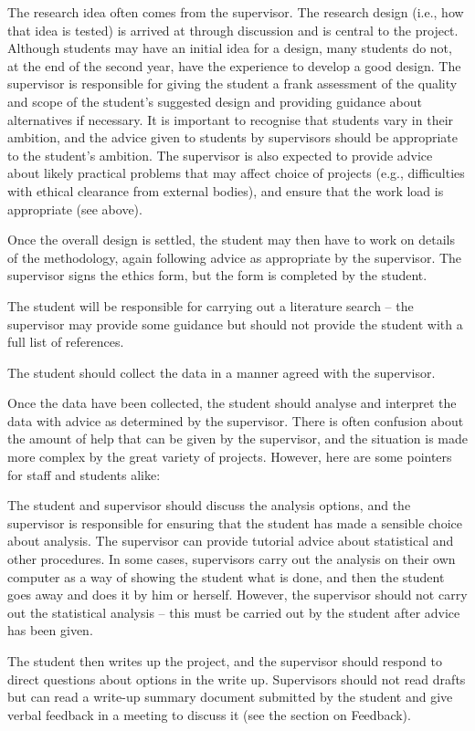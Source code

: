 \documentclass[
]{book}
\begin{document}
The research idea often comes from the supervisor. The research design (i.e., how that idea is tested) is arrived at through discussion and is central to the project. Although students may have an initial idea for a design, many students do not, at the end of the second year, have the experience to develop a good design. The supervisor is responsible for giving the student a frank assessment of the quality and scope of the student's suggested design and providing guidance about alternatives if necessary. It is important to recognise that students vary in their ambition, and the advice given to students by supervisors should be appropriate to the student's ambition. The supervisor is also expected to provide advice about likely practical problems that may affect choice of projects (e.g., difficulties with ethical clearance from external bodies), and ensure that the work load is appropriate (see above).

Once the overall design is settled, the student may then have to work on details of the methodology, again following advice as appropriate by the supervisor. The supervisor signs the ethics form, but the form is completed by the student.

The student will be responsible for carrying out a literature search -- the supervisor may provide some guidance but should not provide the student with a full list of references.

The student should collect the data in a manner agreed with the supervisor.

Once the data have been collected, the student should analyse and interpret the data with advice as determined by the supervisor. There is often confusion about the amount of help that can be given by the supervisor, and the situation is made more complex by the great variety of projects. However, here are some pointers for staff and students alike:

The student and supervisor should discuss the analysis options, and the supervisor is responsible for ensuring that the student has made a sensible choice about analysis. The supervisor can provide tutorial advice about statistical and other procedures. In some cases, supervisors carry out the analysis on their own computer as a way of showing the student what is done, and then the student goes away and does it by him or herself. However, the supervisor should not carry out the statistical analysis -- this must be carried out by the student after advice has been given.

The student then writes up the project, and the supervisor should respond to direct questions about options in the write up. Supervisors should not read drafts but can read a write-up summary document submitted by the student and give verbal feedback in a meeting to discuss it (see the section on Feedback).
\end{document}
